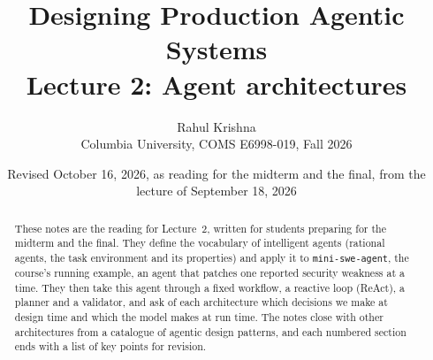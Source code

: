 \documentclass[9pt,twocolumn]{extarticle}
\title{Designing Production Agentic Systems\\Lecture 2: Agent architectures}
\author{Rahul Krishna\\Columbia University, COMS E6998-019, Fall 2026}
\date{Revised October 16, 2026, as reading for the midterm and the final, from the lecture of
September 18, 2026}
\theoremstyle{definition}
\newcommand{\msa}{\texttt{mini-swe-agent}}     %
\begin{document}
\maketitle
\begin{abstract}
These notes are the reading for Lecture~2, written for students preparing for the midterm and the
final. They define the vocabulary of intelligent agents (rational agents, the task environment and
its properties) and apply it to \msa{}, the course's running example, an agent that patches one
reported security weakness at a time. They then take this agent through a fixed workflow, a reactive
loop (ReAct), a planner and a validator, and ask of each architecture which decisions we make at
design time and which the model makes at run time. The notes close with other architectures from a
catalogue of agentic design patterns, and each numbered section ends with a list of key points for
revision.
\end{abstract}
\tableofcontents








\clearpage


\end{document}
